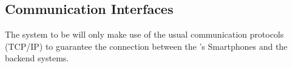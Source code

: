 \documentclass[../../../RASD.tex]{subfiles}
\begin{document}
\subsection{Communication Interfaces\label{sect:3.1.4}}


The system to be will only make use of the usual communication protocols (TCP/IP) to guarantee the connection between the ’s Smartphones and the backend systems.
\end{document}
